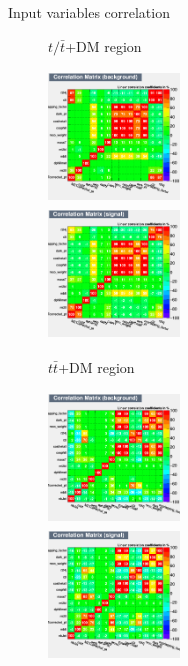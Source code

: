 \documentclass[8pt]{beamer}
\begin{document}
\begin{frame}{Input variables correlation}
\justifying

\begin{figure}[htbp]
\centering
\begin{block}{ \centering $t/\bar t$+DM region}\end{block}
\begin{minipage}[b]{.49\textwidth}	
\begin{center}
\includegraphics[width=3.5cm, height=3.5cm]{figs/corr_background_ST.png}
\end{center}
\end{minipage}\hfill
\begin{minipage}[b]{.49\textwidth}
\begin{center}
\includegraphics[width=3.5cm, height=3.5cm]{figs/corr_signal_ST.png}
\end{center}
\end{minipage} \hfill

\begin{block}{ \centering $t \bar t$+DM region}\end{block}
\begin{minipage}[b]{.49\textwidth}
\begin{center}
\includegraphics[width=3.5cm, height=3.5cm]{figs/corr_background_TTbar.png}
\end{center}
\end{minipage}\hfill
\begin{minipage}[b]{.49\textwidth}
\begin{center}
\includegraphics[width=3.5cm, height=3.5cm]{figs/corr_signal_TTbar.png}
\end{center}
\end{minipage} \hfill


\end{figure}
\end{frame}
\end{document}
